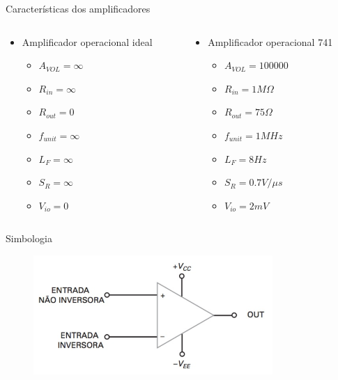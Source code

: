 \documentclass[aspectratio=169,
				xcolor=table]{beamer}
\begin{document}
	\begin{frame}{Características dos amplificadores}
		\begin{columns}
			\begin{column}{0.5\textwidth}
				\begin{itemize}				
					\item Amplificador operacional ideal
					\begin{itemize}					
						\item $A_{VOL} = \infty $
						\item $R_{in} = \infty $
						\item $R_{out} = 0$
						\item $f_{unit} = \infty $
						\item $L_F = \infty$
						\item $S_R = \infty$
						\item $V_{io} = 0$
					\end{itemize}
				\end{itemize}
			\end{column}
			\begin{column}{0.5\textwidth}
				\begin{itemize}				
					\item Amplificador operacional 741
					\begin{itemize}					
						\item $A_{VOL} = 100000 $
						\item $R_{in} = 1 M\Omega $
						\item $R_{out} = 75 \Omega$
						\item $f_{unit} = 1MHz $
						\item $L_F = 8 Hz$
						\item $S_R = 0.7 V/\mu s$
						\item $V_{io} = 2mV$
					\end{itemize}
				\end{itemize}
			\end{column}
		\end{columns}		
	\end{frame}
	
	\begin{frame}{Simbologia}
		\begin{figure}[hbtp]
		\centering
		\includegraphics[height=.7\textheight, keepaspectratio]{../figs/cap02/ampop.PNG}
		\end{figure}		
	\end{frame}
	
\end{document}
